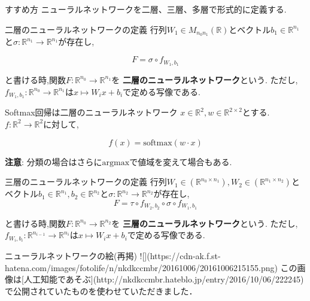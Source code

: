 \begin{frame}[fragile]{すすめ方}
ニューラルネットワークを二層、三層、多層で形式的に定義する.

\end{frame}


\begin{frame}[fragile]{二層のニューラルネットワークの定義}
行列$W_1 \in M_{n_0 n_1}(\mathbb{R})$とベクトル$b_1  \in \mathbb{R}^{n_1}$と$\sigma:\mathbb{R}^{n_1}  \to \mathbb{R}^{n_1}$が存在し,

\begin{equation*}
F = \sigma \circ f_{W_1,b_1}
\end{equation*}

と書ける時,関数$F:\mathbb{R}^{n_0} \to \mathbb{R}^{n_1}$を \textbf{二層のニューラルネットワーク}という.
ただし,$f_{W_1,b_1}:\mathbb{R}^{n_{0}} \to \mathbb{R}^{n_1}$は$ x \mapsto W_ix+b_i$で定める写像である.
\end{frame}


\begin{frame}[fragile]{Softmax回帰は二層のニューラルネットワーク}
$x \in \mathbb{R}^2, w \in \mathbb{R}^{2 \times 2}$とする.$f:  \mathbb{R}^2 \to  \mathbb{R}^2$に対して,

\begin{equation*}
  f(x) = \mathrm{softmax}(w \cdot x)
\end{equation*}

\textbf{注意}: 分類の場合はさらに$\mathrm{argmax}$で値域を変えて場合もある.
\end{frame}


\begin{frame}[fragile]{三層のニューラルネットワークの定義}
行列$W_1 \in (\mathbb{R}^{n_0 \times n_1}),W_2 \in (\mathbb{R}^{n_1 \times n_2})$とベクトル$b_1  \in \mathbb{R}^{n_1} ,b_2 \in \mathbb{R}^{n_2}$と$ \sigma:\mathbb{R}^{n_2}  \to \mathbb{R}^{n_2}$が存在し,
\begin{equation*}
F = \tau \circ f_{W_2,b_2} \circ \sigma \circ f_{W_1,b_1}
\end{equation*}

と書ける時,関数$F:\mathbb{R}^{n_0} \to \mathbb{R}^{n_2}$を \textbf{三層のニューラルネットワーク}という.
ただし,$f_{W_i,b_i}:\mathbb{R}^{n_{i-1}} \to \mathbb{R}^{n_i}$は$ x \mapsto W_ix+b_i$で定める写像である.
\end{frame}


\begin{frame}[fragile]{ニューラルネットワークの絵(再掲)}
![](https://cdn-ak.f.st-hatena.com/images/fotolife/n/nkdkccmbr/20161006/20161006215155.png)
この画像は[人工知能であそぶ](http://nkdkccmbr.hateblo.jp/entry/2016/10/06/222245)で公開されていたものを使わせていただきました．

\end{frame}


